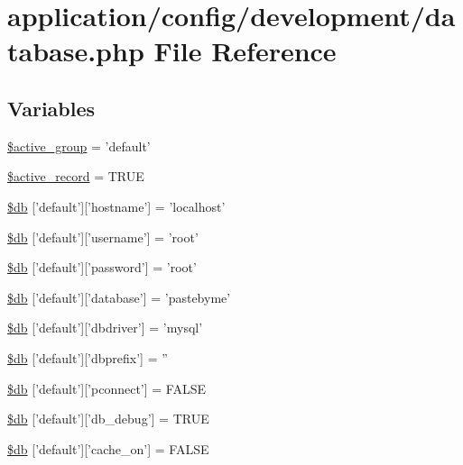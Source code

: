 \hypertarget{development_2database_8php}{\section{application/config/development/database.php File Reference}
\label{development_2database_8php}
}
\subsection*{Variables}
\begin{DoxyCompactItemize}
\item 
\hyperlink{development_2database_8php_a5046ea83a698c5b7bbf6ffd3dd816b65}{\$active\-\_\-group} = 'default'
\item 
\hyperlink{development_2database_8php_a228b6ea91602f48a8831d0dc94809b94}{\$active\-\_\-record} = T\-R\-U\-E
\item 
\hyperlink{development_2database_8php_a987b8cb0ae83b9519cb7c36fe25dbdd8}{\$db} \mbox{[}'default'\mbox{]}\mbox{[}'hostname'\mbox{]} = 'localhost'
\item 
\hyperlink{development_2database_8php_a2f535f16fa00521992cfc791c8dcec37}{\$db} \mbox{[}'default'\mbox{]}\mbox{[}'username'\mbox{]} = 'root'
\item 
\hyperlink{development_2database_8php_a1f6afce218438d9f7d13e28ee602e29b}{\$db} \mbox{[}'default'\mbox{]}\mbox{[}'password'\mbox{]} = 'root'
\item 
\hyperlink{development_2database_8php_a87e73e2a5365d1ee95a673b551238fef}{\$db} \mbox{[}'default'\mbox{]}\mbox{[}'database'\mbox{]} = 'pastebyme'
\item 
\hyperlink{development_2database_8php_a9f97429a3096d60fa26291b35f6cb7a9}{\$db} \mbox{[}'default'\mbox{]}\mbox{[}'dbdriver'\mbox{]} = 'mysql'
\item 
\hyperlink{development_2database_8php_ae0a3c1b4e2a1907dc70671ee97901456}{\$db} \mbox{[}'default'\mbox{]}\mbox{[}'dbprefix'\mbox{]} = ''
\item 
\hyperlink{development_2database_8php_a0bf35d484095b6728c2666580924569b}{\$db} \mbox{[}'default'\mbox{]}\mbox{[}'pconnect'\mbox{]} = F\-A\-L\-S\-E
\item 
\hyperlink{development_2database_8php_aa79c6a73d78063a2b2ee6903a9851908}{\$db} \mbox{[}'default'\mbox{]}\mbox{[}'db\-\_\-debug'\mbox{]} = T\-R\-U\-E
\item 
\hyperlink{development_2database_8php_a05a82adb11460f351c1df4ae9be71866}{\$db} \mbox{[}'default'\mbox{]}\mbox{[}'cache\-\_\-on'\mbox{]} = F\-A\-L\-S\-E

\end{DoxyCompactItemize}
